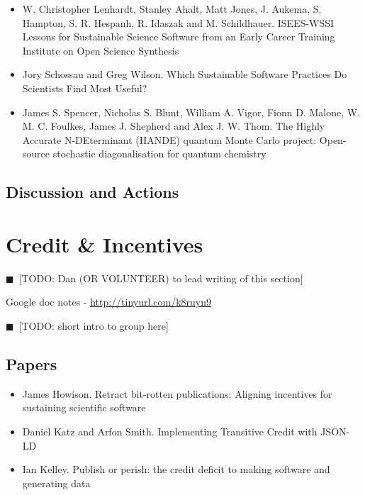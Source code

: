 \documentclass[11pt, oneside]{amsart}
\newcommand{\todo}[1]{{\color{blue}$\blacksquare$~\textsf{[TODO: #1]}}}
\begin{document}
\begin{itemize}
\item W. Christopher Lenhardt, Stanley Ahalt, Matt Jones, J. Aukema, S. Hampton,
S. R. Hespanh, R. Idaszak and M. Schildhauer. {ISEES-WSSI} Lessons for
Sustainable Science Software from an Early Career Training Institute on Open
Science Synthesis~\cite{wssspe2_lenhardt}

\item Jory Schossau and Greg Wilson. Which Sustainable Software Practices Do
Scientists Find Most Useful?~\cite{wssspe2_schossau}

\item James S. Spencer, Nicholas S. Blunt, William A. Vigor, Fionn D. Malone, W.
M. C. Foulkes, James J. Shepherd and Alex J. W. Thom. The {H}ighly {A}ccurate
{N-DE}terminant ({HANDE}) quantum {Monte Carlo} project: Open-source stochastic
diagonalisation for quantum chemistry~\cite{wssspe2_spencer}
\end{itemize}

\subsection{Discussion and Actions}

\section{Credit \& Incentives}
\todo{Dan (OR VOLUNTEER) to lead writing of this section}

Google doc notes - \url{http://tinyurl.com/k8ruyn9}

\todo{short intro to group here}

\subsection{Papers}
\begin{itemize}
\item James Howison. Retract bit-rotten publications: Aligning incentives for
sustaining scientific software~\cite{wssspe2_howison}

\item Daniel Katz and Arfon Smith. Implementing Transitive Credit with
{JSON-LD}~\cite{wssspe2_katz}

\item Ian Kelley. Publish or perish: the credit deficit to making software and
generating data~\cite{wssspe2_kelley}
\end{itemize}
\end{document}
